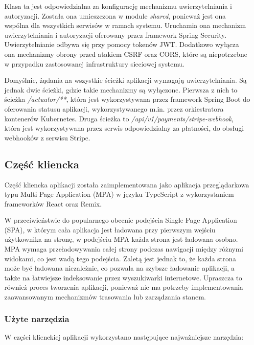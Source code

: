 Klasa ta jest odpowiedzialna za konfigurację mechanizmu uwierzytelniania i autoryzacji. Została ona umieszczona w module \textit{shared}, ponieważ jest ona wspólna dla wszystkich serwisów w ramach systemu. Uruchamia ona mechanizm uwierzytelniania i autoryzacji oferowany przez framework Spring Security. Uwierzytelnianie odbywa się przy pomocy tokenów JWT. Dodatkowo wyłącza ona mechanizmy obrony przed atakiem CSRF oraz CORS, które są niepotrzebne w przypadku zastosowanej infrastruktury sieciowej systemu.

Domyślnie, żądania na wszystkie ścieżki aplikacji wymagają uwierzytelniania. Są jednak dwie ścieżki, gdzie takie mechanizmy są wyłączone. Pierwsza z nich to ścieżka \textit{/actuator/**}, która jest wykorzystywana przez framework Spring Boot do oferowania statusu aplikacji, wykorzystywanego m.in. przez orkiestratora kontenerów Kubernetes. Druga ścieżka to \textit{/api/v1/payments/stripe-webhook}, która jest wykorzystywana przez serwis odpowiedzialny za płatności, do obsługi webhooków z serwisu Stripe.

\subsection{Część kliencka}

Część kliencka aplikacji została zaimplementowana jako aplikacja przeglądarkowa typu Multi Page Application (MPA) w języku TypeScript z wykorzystaniem frameworków React oraz Remix.

W przeciwieństwie do popularnego obecnie podejścia Single Page Application (SPA), w którym cała aplikacja jest ładowana przy pierwszym wejściu użytkownika na stronę, w podejściu MPA każda strona jest ładowana osobno. MPA wymaga przeładowywania całej strony podczas nawigacji między różnymi widokami, co jest wadą tego podejścia. Zaletą jest jednak to, że każda strona może być ładowana niezależnie, co pozwala na szybsze ładowanie aplikacji, a także na łatwiejsze indeksowanie przez wyszukiwarki internetowe. Upraszcza to również proces tworzenia aplikacji, ponieważ nie ma potrzeby implementowania zaawansowanym mechanizmów trasowania lub zarządzania stanem.

\subsubsection{Użyte narzędzia}

W części klienckiej aplikacji wykorzystano następujące najważniejsze narzędzia:

